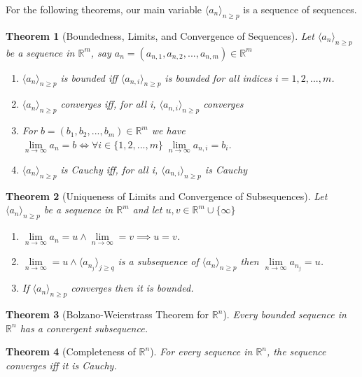 \documentclass[11pt, oneside]{book}
\theoremstyle{break}
\newtheorem{thm}{Theorem}[section]
\newcommand{\bb}[1]{\mathbb{#1}}		%
\begin{document}
For the following theorems, our main variable $\langle a_n \rangle_{n \geq p}$ is a sequence of sequences.

\begin{thm}[Boundedness, Limits, and Convergence of Sequences]
	Let $\langle a_n \rangle_{n \geq p}$ be a sequence in $\bb{R}^m$, say $a_n = (a_{n ,1}, a_{n, 2}, ..., a_{n, m}) \in \bb{R}^m$
	\begin{enumerate}
		\item $\langle a_n \rangle_{n \geq p}$ is bounded iff $\langle a_{n, i} \rangle_{n \geq p}$ is bounded for all indices $i = 1, 2, ..., m$.
		\item $\langle a_n \rangle_{n \geq p}$ converges iff, for all i, $\langle a_{n, i} \rangle_{n \geq p}$ converges
		\item For $b = (b_1, b_2, ..., b_m) \in \bb{R}^m$ we have $\lim\limits_{n \to \infty} a_n = b \iff \forall i \in \{1, 2, ..., m\} \; \lim\limits_{n \to \infty} a_{n, i} = b_i$.
		\item $\langle a_n \rangle_{n \geq p}$ is Cauchy iff, for all i, $\langle a_{n, i} \rangle_{n \geq p}$ is Cauchy
	\end{enumerate}
\end{thm}

\begin{thm}[Uniqueness of Limits and Convergence of Subsequences]
	Let $\langle a_n \rangle_{n \geq p}$ be a sequence in $\bb{R}^m$ and let $u, v \in \bb{R}^m \cup \{\infty\}$
	\begin{enumerate}
		\item $\lim\limits_{n \to \infty} a_n = u \land \lim\limits_{n \to \infty} = v \implies u = v$.
		\item $\lim\limits_{n \to \infty} = u \land \langle a_{n_j} \rangle_{j \geq q}$ is a subsequence of $\langle a_n \rangle_{n \geq p}$ then $\lim\limits_{n \to \infty} a_{n_j} = u$.
		\item If $\langle a_n \rangle_{n \geq p}$ converges then it is bounded.
	\end{enumerate}
\end{thm}

\begin{thm}[Bolzano-Weierstrass Theorem for $\bb{R}^n$]
	Every bounded sequence in $\bb{R}^n$ has a convergent subsequence.
\end{thm}

\begin{thm}[Completeness of $\bb{R}^n$]
	For every sequence in $\bb{R}^n$, the sequence converges iff it is Cauchy.
\end{thm}
\end{document}
